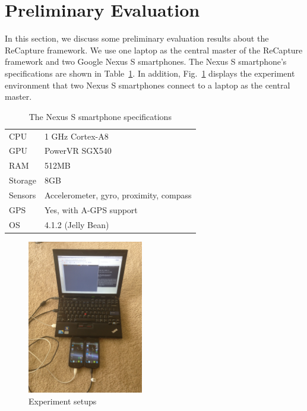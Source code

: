 \section{Preliminary Evaluation}\label{sec:evaluation}
In this section, we discuss some preliminary evaluation results about the ReCapture framework. We use one laptop as the central master of the ReCapture framework and two Google Nexus S smartphones. The Nexus S smartphone's specifications are shown in Table~\ref{tab:nexus}. In addition, Fig.~\ref{fig:exp} displays the experiment environment that two Nexus S smartphones connect to a laptop as the central master.

\begin{table}
\centering
\caption{The Nexus S smartphone specifications}
\begin{tabular}{ll}\toprule
CPU & 1 GHz Cortex-A8 \\
GPU & PowerVR SGX540 \\
RAM & 512MB \\
Storage & 8GB \\
Sensors & Accelerometer, gyro, proximity, compass \\
GPS & Yes, with A-GPS support\\
OS & 4.1.2 (Jelly Bean) \\\bottomrule
\end{tabular}
\label{tab:nexus}
\end{table}

\begin{figure}
\centering
\includegraphics[width=0.45\textwidth]{figures/experiment.jpg}
\caption{Experiment setups}
\label{fig:exp}
\end{figure}

